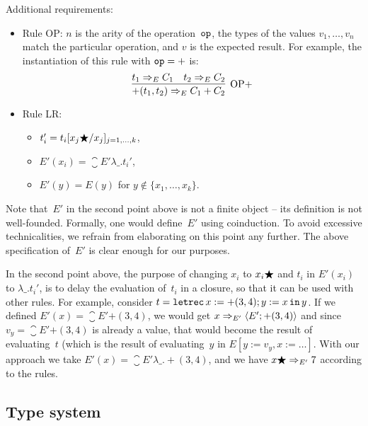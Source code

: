 \documentclass[
    9pt,            %
    techreport,        %
    affiltop,       %
]{art}
\begin{document}
Additional requirements:
\begin{itemize}
\item Rule OP: $n$ is the arity of the operation~$\mathtt{op}$, the types of the
values $v_1,\ldots,v_n$ match the particular operation, and $v$ is the
expected result. For example, the instantiation of this rule with $\mathtt{op} =
{+}$ is:
\[
\infer[\mathrm{OP}{+}]{\eval{{+}(t_1,t_2)}{E}{C_1 + C_2}}{\eval{t_1}{E}{C_1} & \eval{t_2}{E}{C_2}}
\]
\item Rule LR:
    \begin{itemize}
    \item $t_i' = t_i[x_j\bigstar/x_j]_{j=1,\ldots,k}$,
    \item $E'(x_i) = \closure{E'}{\lambda \_ . t_i'}$,
    \item $E'(y) = E(y)$ for $y \notin \{x_1,\ldots,x_k\}$.
    \end{itemize}
\end{itemize}

\begin{remark}
Note that~$E'$ in the second point above is not a finite object -- its definition is not
well-founded. Formally, one would define~$E'$ using coinduction. To
avoid excessive technicalities, we refrain from elaborating on this
    point any further. The above specification of~$E'$ is clear enough for
    our purposes.
\end{remark}

\begin{remark}
    In the second point above, the purpose of changing $x_i$ to $x_i \bigstar$ and $t_i$ in $E'(x_i)$
    to $\lambda \_ . t_i'$, is to delay the evaluation of~$t_i$ in a
    closure, so that it can be used with other rules. For example, consider
    $t = \mathtt{letrec}\,x := {+}(3,4); y := x\,\mathtt{in}\,y$. If we defined $E'(x) =
    \closure{E'}{{+}(3,4)}$, we would get
    $x\Rightarrow_{E'} \langle E'; {+}(3,4) \rangle$ and since $v_y =
    \closure{E'}{{+}(3,4)}$ is already a value, that would become the
    result of evaluating~$t$ (which is the result of evaluating~$y$ in
    $E[y:=v_y,x:=\ldots]$. With our approach we take $E'(x) =
    \closure{E'}{\lambda \_ . {+}(3,4)}$, and we have
    $x\bigstar\Rightarrow_{E'} 7$ according to the rules.
\end{remark}

\subsection{Type system}\label{sec_type_system}
\end{document}

